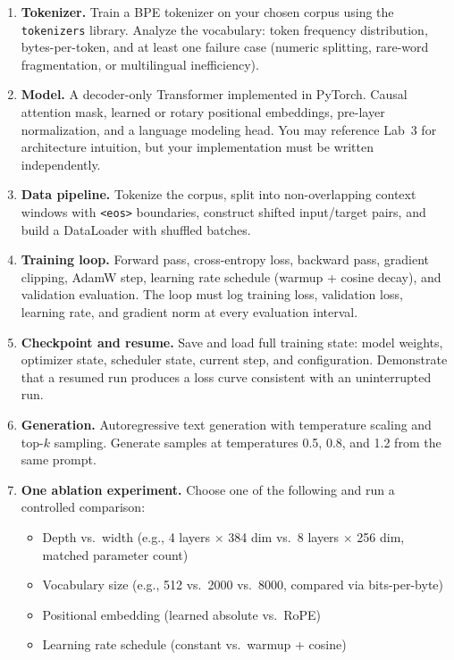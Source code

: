 \begin{enumerate}[nosep]
  \item \textbf{Tokenizer.} Train a BPE tokenizer on your chosen corpus using the \texttt{tokenizers} library. Analyze the vocabulary: token frequency distribution, bytes-per-token, and at least one failure case (numeric splitting, rare-word fragmentation, or multilingual inefficiency).

  \item \textbf{Model.} A decoder-only Transformer implemented in PyTorch. Causal attention mask, learned or rotary positional embeddings, pre-layer normalization, and a language modeling head. You may reference Lab~3 for architecture intuition, but your implementation must be written independently.

  \item \textbf{Data pipeline.} Tokenize the corpus, split into non-overlapping context windows with \texttt{<eos>} boundaries, construct shifted input/target pairs, and build a DataLoader with shuffled batches.

  \item \textbf{Training loop.} Forward pass, cross-entropy loss, backward pass, gradient clipping, AdamW step, learning rate schedule (warmup + cosine decay), and validation evaluation. The loop must log training loss, validation loss, learning rate, and gradient norm at every evaluation interval.

  \item \textbf{Checkpoint and resume.} Save and load full training state: model weights, optimizer state, scheduler state, current step, and configuration. Demonstrate that a resumed run produces a loss curve consistent with an uninterrupted run.

  \item \textbf{Generation.} Autoregressive text generation with temperature scaling and top-$k$ sampling. Generate samples at temperatures 0.5, 0.8, and 1.2 from the same prompt.

  \item \textbf{One ablation experiment.} Choose one of the following and run a controlled comparison:
  \begin{itemize}[nosep]
    \item Depth vs.\ width (e.g., 4 layers $\times$ 384 dim vs.\ 8 layers $\times$ 256 dim, matched parameter count)
    \item Vocabulary size (e.g., 512 vs.\ 2000 vs.\ 8000, compared via bits-per-byte)
    \item Positional embedding (learned absolute vs.\ RoPE)
    \item Learning rate schedule (constant vs.\ warmup + cosine)
  \end{itemize}
\end{enumerate}


